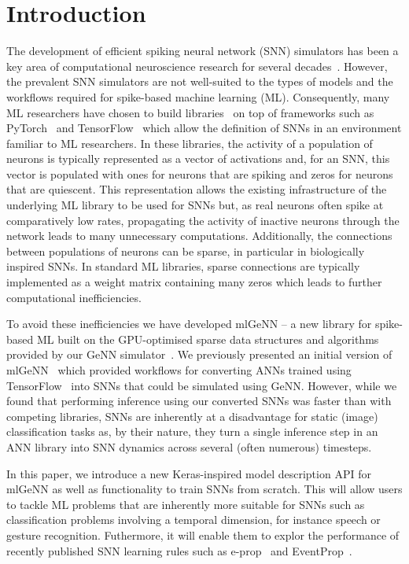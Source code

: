 \documentclass[sigconf]{acmart}
\begin{document}
\section{Introduction}
The development of efficient spiking neural network (SNN) simulators has been a key area of computational neuroscience research for several decades~\citep{carnevale2006neuron, Gewaltig2007, Golosio2021, Akar2019,Yavuz2016}.
However, the prevalent SNN simulators are not well-suited to the types of models and the workflows required for spike-based machine learning (ML).
Consequently, many ML researchers have chosen to build libraries~\citep{norse2021, SpikingJelly,eshraghian2021training,Hazan2018,zhao_neko_2021} on top of frameworks such as PyTorch~\citep{paszke2019pytorch} and TensorFlow~\citep{TensorFlow} which allow the definition of SNNs in an environment familiar to ML researchers.
In these libraries, the activity of a population of neurons is typically represented as a vector of activations and, for an SNN, this vector is populated with ones for neurons that are spiking and zeros for neurons that are quiescent. 
This representation allows the existing infrastructure of the underlying ML library to be used for SNNs but, as real neurons often spike at comparatively low rates, propagating the activity of inactive neurons through the network leads to many unnecessary computations.
Additionally, the connections between populations of neurons can be sparse, in particular in biologically inspired SNNs. In standard ML libraries, sparse connections are typically implemented as a weight matrix containing many zeros which leads to further computational inefficiencies.

To avoid these inefficiencies we have developed mlGeNN -- a new library for spike-based ML built on the GPU-optimised sparse data structures and algorithms provided by our GeNN simulator~\citep{Yavuz2016,Knight2018,Knight2021}.
We previously presented an initial version of mlGeNN~\citep{Turner2022} which provided workflows for converting ANNs trained using TensorFlow~\citep{TensorFlow} into SNNs that could be simulated using GeNN.
However, while we found that performing inference using our converted SNNs was faster than with competing libraries, SNNs are inherently at a disadvantage for static (image) classification tasks as, by their nature, they turn a single inference step in an ANN library into SNN dynamics across several (often numerous) timesteps.

In this paper, we introduce a new Keras-inspired model description API for mlGeNN as well as functionality to train SNNs from scratch.
This will allow users to tackle ML problems that are inherently more suitable for SNNs such as classification problems involving a temporal dimension, for instance speech or gesture recognition. Futhermore, it will enable them to explor the performance of recently published SNN learning rules such as e-prop~\citep{Bellec2020} and EventProp~\citep{Wunderlich2021}.
\end{document}
